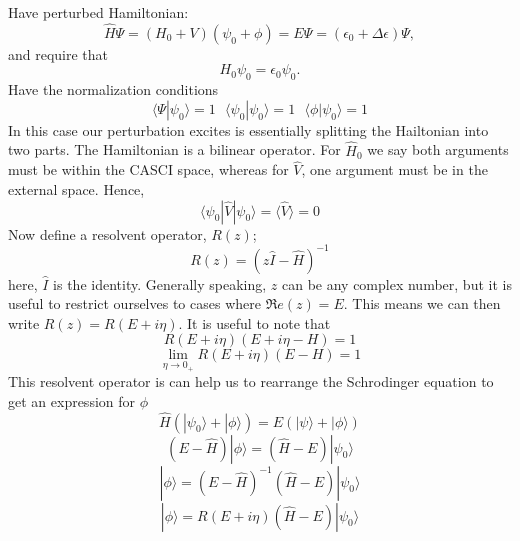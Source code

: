 \documentclass[12pt]{article}
\begin{document}
Have perturbed Hamiltonian:
\begin{equation}
\hat{H}\Psi = ( H_{0} +V )( \psi_{0}+ \phi ) = E \Psi = (\epsilon_{0} + \Delta \epsilon) \Psi,
\end{equation}
and require that 
\begin{equation}
H_{0}\psi_{0} = \epsilon_{0}\psi_{0}.
\end{equation}
\noindent Have the normalization conditions 
\begin{equation}
\langle \Psi | \psi_{0} \rangle = 1 \text{ \ \ \ \ } 
\langle \psi_{0} | \psi_{0} \rangle = 1 \text{ \ \ \ \ } 
\langle \phi | \psi_{0} \rangle = 1 
\end{equation}
\noindent In this case our perturbation excites is essentially splitting the Hailtonian into 
two parts. The Hamiltonian is a bilinear operator. For $\hat{H}_{0}$ we
say both arguments must be within the CASCI space, whereas for $\hat{V}$, one argument must be in 
the external space. Hence,
\begin{equation}
\langle \psi_{0} | \hat{V} | \psi_{0} \rangle = \langle \hat{V} \rangle = 0
\end{equation}
Now define a resolvent operator, $R(z)$;
\begin{equation}
R(z) = (z\hat{I}-\hat{H})^{-1}
\end{equation} 
here, $\hat{I}$ is the identity. Generally speaking, $z$ can be any complex number, but it is useful
to restrict ourselves to cases where $\Re e(z) = E$. This means we can then write $R(z)= R(E+i\eta) $. 
It is useful to note that
\begin{equation}
R(E+i\eta)(E+i\eta-H)= 1
\end{equation}
\begin{equation}
\lim_{\eta \rightarrow 0_{+}} R(E+i\eta)(E-H)= 1
\end{equation}
\noindent This resolvent operator is can help us to rearrange the Schrodinger equation to get an expression for
$\phi$
\begin{equation*}
\hat{H} (|\psi_{0}\rangle + |\phi\rangle)  = E(|\psi\rangle+ |\phi\rangle)
\end{equation*}
\begin{equation*}
 (E-\hat{H}) | \phi\rangle
=
(\hat{H}-E)|\psi_{0} \rangle
 \end{equation*}
\begin{equation*}
|\phi \rangle =  (E-\hat{H})^{-1} (\hat{H}-E)|\psi_{0} \rangle
\end{equation*}
\begin{equation*}
 |\phi \rangle = R(E + i\eta) (\hat{H}-E)|\psi_{0} \rangle 
\end{equation*}
\end{document}
